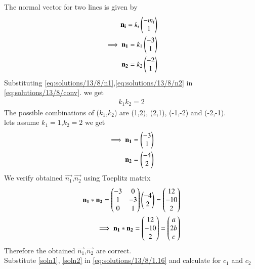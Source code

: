 The normal vector for two lines is given by
\begin{align}
    \mathbf{n_i}=k_i\begin{pmatrix}-m_i\\1\end{pmatrix}\label{eq:solutions/13/8/normvec}\\
    \implies\mathbf{n_1}=k_1\begin{pmatrix}-3\\1\end{pmatrix}\label{eq:solutions/13/8/n1}\\
    \mathbf{n_2}=k_2\begin{pmatrix}-2\\1\end{pmatrix}\label{eq:solutions/13/8/n2}
\end{align}
Substituting \eqref{eq:solutions/13/8/n1},\eqref{eq:solutions/13/8/n2} in \eqref{eq:solutions/13/8/conv}. we get
\begin{align}
    k_1k_2=2
\end{align}
The possible combinations of ($k_1$,$k_2$) are (1,2), (2,1), (-1,-2) and (-2,-1).\\
lets assume $k_1=1$,$k_2=2$ we get
\begin{align}
    \implies\mathbf{n_1}=\begin{pmatrix}-3\\1\end{pmatrix}\label{soln1}\\
    \mathbf{n_2}=\begin{pmatrix}-4\\2\end{pmatrix}\label{soln2}
\end{align}
We verify obtained $\vec{n_1}$,$\vec{n_2}$ using Toeplitz matrix
\begin{align}
    \mathbf{n_1}*\mathbf{n_2}=\begin{pmatrix}-3 & 0\\1 & -3\\0 & 1\end{pmatrix}\begin{pmatrix}-4 \\ 2\end{pmatrix}=\begin{pmatrix}12\\-10\\2\end{pmatrix}\label{eq:solutions/13/8/comp1}\\
    \implies \mathbf{n_1}*\mathbf{n_2}=\begin{pmatrix}12\\-10\\2\end{pmatrix}=\begin{pmatrix}a\\2b\\c\end{pmatrix}
\end{align}
Therefore the obtained $\vec{n_1}$,$\vec{n_2}$ are correct.\\
Substitute \eqref{soln1}, \eqref{soln2} in \eqref{eq:solutions/13/8/1.16}
and calculate for $c_1$ and $c_2$

